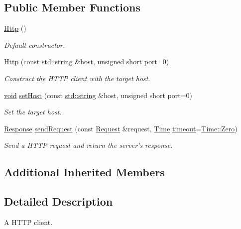 \subsection*{Public Member Functions}
\begin{DoxyCompactItemize}
\item 
\hyperlink{classsf_1_1_http_abe2360194f99bdde402c9f97a85cf067}{Http} ()
\begin{DoxyCompactList}\small\item\em Default constructor. \end{DoxyCompactList}\item 
\hyperlink{classsf_1_1_http_a79efd844a735f083fcce0edbf1092385}{Http} (const \hyperlink{gl3_8h_ac83513893df92266f79a515488701770}{std\-::string} \&host, unsigned short port=0)
\begin{DoxyCompactList}\small\item\em Construct the H\-T\-T\-P client with the target host. \end{DoxyCompactList}\item 
\hyperlink{glutf90_8h_ac778d6f63f1aaf8ebda0ce6ac821b56e}{void} \hyperlink{classsf_1_1_http_a55121d543b61c41cf20b885a97b04e65}{set\-Host} (const \hyperlink{gl3_8h_ac83513893df92266f79a515488701770}{std\-::string} \&host, unsigned short port=0)
\begin{DoxyCompactList}\small\item\em Set the target host. \end{DoxyCompactList}\item 
\hyperlink{classsf_1_1_http_1_1_response}{Response} \hyperlink{classsf_1_1_http_aaf09ebfb5e00dcc82e0d494d5c6a9e2a}{send\-Request} (const \hyperlink{classsf_1_1_http_1_1_request}{Request} \&request, \hyperlink{classsf_1_1_time}{Time} \hyperlink{gl3_8h_ad29bb0d8468b264a4e3d9204366cfaab}{timeout}=\hyperlink{classsf_1_1_time_a8db127b632fa8da21550e7282af11fa0}{Time\-::\-Zero})
\begin{DoxyCompactList}\small\item\em Send a H\-T\-T\-P request and return the server's response. \end{DoxyCompactList}\end{DoxyCompactItemize}
\subsection*{Additional Inherited Members}


\subsection{Detailed Description}
A H\-T\-T\-P client. 

